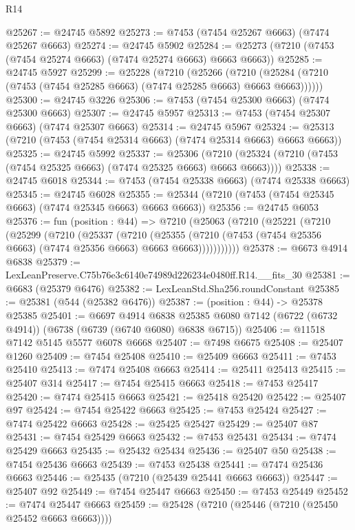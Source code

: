 \begin{lexlean}{R14}
\begin{coremodule}
@25267 := @24745 @5892
@25273 := @7453 (@7454 @25267 @6663) (@7474 @25267 @6663)
@25274 := @24745 @5902
@25284 := @25273 (@7210 (@7453 (@7454 @25274 @6663) (@7474 @25274 @6663) @6663 @6663))
@25285 := @24745 @5927
@25299 := @25228
    (@7210
      (@25266
        (@7210 (@25284 (@7210 (@7453 (@7454 @25285 @6663) (@7474 @25285 @6663) @6663 @6663))))))
@25300 := @24745 @3226
@25306 := @7453 (@7454 @25300 @6663) (@7474 @25300 @6663)
@25307 := @24745 @5957
@25313 := @7453 (@7454 @25307 @6663) (@7474 @25307 @6663)
@25314 := @24745 @5967
@25324 := @25313 (@7210 (@7453 (@7454 @25314 @6663) (@7474 @25314 @6663) @6663 @6663))
@25325 := @24745 @5992
@25337 := @25306
    (@7210 (@25324 (@7210 (@7453 (@7454 @25325 @6663) (@7474 @25325 @6663) @6663 @6663))))
@25338 := @24745 @6018
@25344 := @7453 (@7454 @25338 @6663) (@7474 @25338 @6663)
@25345 := @24745 @6028
@25355 := @25344 (@7210 (@7453 (@7454 @25345 @6663) (@7474 @25345 @6663) @6663 @6663))
@25356 := @24745 @6053
@25376 := fun (position : @44) =>
  @7210
    (@25063
      (@7210
        (@25221
          (@7210
            (@25299
              (@7210
                (@25337
                  (@7210
                    (@25355
                      (@7210 (@7453 (@7454 @25356 @6663) (@7474 @25356 @6663) @6663 @6663)))))))))))
@25378 := @6673 @4914 @6838
@25379 := LexLeanPreserve.C75b76e3c6140e74989d226234e0480ff.R14.__fits_30
@25381 := @6683 (@25379 @6476)
@25382 := LexLeanStd.Sha256.roundConstant
@25385 := @25381 (@544 (@25382 @6476))
@25387 := (position : @44) -> @25378 @25385
@25401 := @6697
    @4914
    @6838
    @25385
    @6080
    @7142
    (@6722 (@6732 @4914))
    (@6738 (@6739 (@6740 @6080) @6838 @6715))
@25406 := @11518 @7142 @5145 @5577 @6078 @6668
@25407 := @7498 @6675
@25408 := @25407 @1260
@25409 := @7454 @25408
@25410 := @25409 @6663
@25411 := @7453 @25410
@25413 := @7474 @25408 @6663
@25414 := @25411 @25413
@25415 := @25407 @314
@25417 := @7454 @25415 @6663
@25418 := @7453 @25417
@25420 := @7474 @25415 @6663
@25421 := @25418 @25420
@25422 := @25407 @97
@25424 := @7454 @25422 @6663
@25425 := @7453 @25424
@25427 := @7474 @25422 @6663
@25428 := @25425 @25427
@25429 := @25407 @87
@25431 := @7454 @25429 @6663
@25432 := @7453 @25431
@25434 := @7474 @25429 @6663
@25435 := @25432 @25434
@25436 := @25407 @50
@25438 := @7454 @25436 @6663
@25439 := @7453 @25438
@25441 := @7474 @25436 @6663
@25446 := @25435 (@7210 (@25439 @25441 @6663 @6663))
@25447 := @25407 @92
@25449 := @7454 @25447 @6663
@25450 := @7453 @25449
@25452 := @7474 @25447 @6663
@25459 := @25428 (@7210 (@25446 (@7210 (@25450 @25452 @6663 @6663))))

\end{coremodule}
\end{lexlean}
